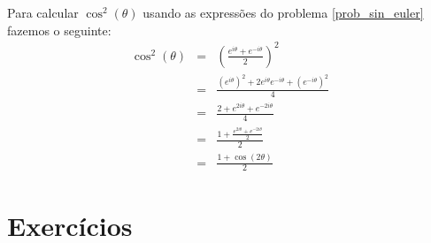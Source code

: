 \begin{ex}Para calcular $\cos^2(\theta)$ usando as expressões do problema \ref{prob_sin_euler} fazemos o seguinte:
\begin{eqnarray*}
\cos^2(\theta)&=&\left(\frac{e^{i\theta}+e^{-i\theta}}{2}\right)^2\\
&=&\frac{\left(e^{i\theta}\right)^2+2e^{i\theta}e^{-i\theta}+\left(e^{-i\theta}\right)^2}{4}\\
&=&\frac{2+e^{2i\theta}+e^{-2i\theta}}{4}\\
&=&\frac{1+\frac{e^{2i\theta}+e^{-2i\theta}}{2}}{2}\\
&=&\frac{1+\cos(2\theta)}{2}
\end{eqnarray*}

\end{ex}






\section{Exercícios}

